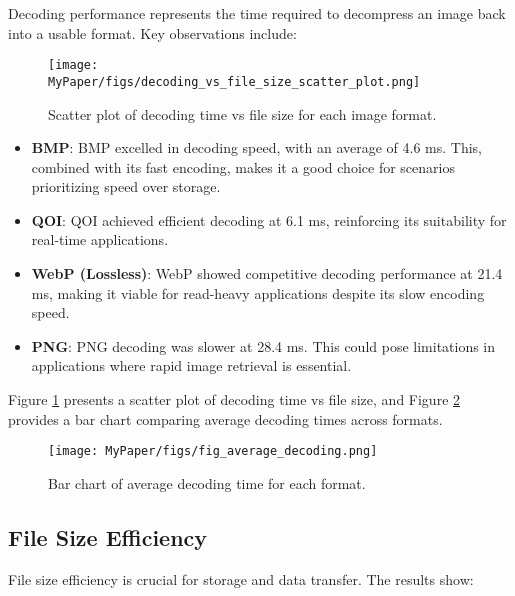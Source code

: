 \documentclass[conference]{IEEEtran}
\begin{document}
Decoding performance represents the time required to decompress an image back into a usable format. Key observations include:

\begin{figure}[H]
    \centering
    \texttt{[image: MyPaper/figs/decoding\_vs\_file\_size\_scatter\_plot.png]}
    \caption{Scatter plot of decoding time vs file size for each image format.}
    \label{fig:decoding_scatter}
\end{figure}

\begin{itemize}
    \item \textbf{BMP}: BMP excelled in decoding speed, with an average of 4.6 ms. This, combined with its fast encoding, makes it a good choice for scenarios prioritizing speed over storage.
    \item \textbf{QOI}: QOI achieved efficient decoding at 6.1 ms, reinforcing its suitability for real-time applications.
    \item \textbf{WebP (Lossless)}: WebP showed competitive decoding performance at 21.4 ms, making it viable for read-heavy applications despite its slow encoding speed.
    \item \textbf{PNG}: PNG decoding was slower at 28.4 ms. This could pose limitations in applications where rapid image retrieval is essential.
\end{itemize}

Figure \ref{fig:decoding_scatter} presents a scatter plot of decoding time vs file size, and Figure \ref{fig:decoding_bar} provides a bar chart comparing average decoding times across formats.

\begin{figure}[htbp]
    \centering
    \texttt{[image: MyPaper/figs/fig\_average\_decoding.png]}
    \caption{Bar chart of average decoding time for each format.}
    \label{fig:decoding_bar}
\end{figure}

\subsection{File Size Efficiency}

File size efficiency is crucial for storage and data transfer. The results show:
\end{document}
